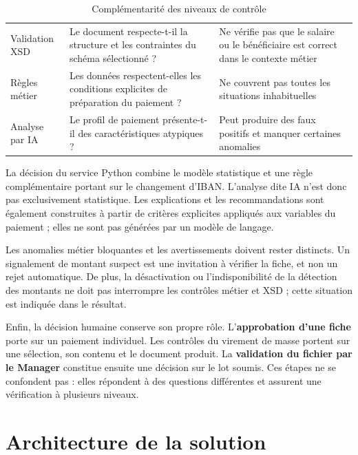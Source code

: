 \begin{table}[H]
\centering
\small
\renewcommand{\arraystretch}{1.25}
\tablestyle
\begin{tabularx}{\textwidth}{|>{\raggedright\arraybackslash}p{2.7cm}|Y|Y|}
\hline
{} &  &  \\
\hline
Validation XSD & Le document respecte-t-il la structure et les contraintes du schéma sélectionné ? & Ne vérifie pas que le salaire ou le bénéficiaire est correct dans le contexte métier \\
\hline
Règles métier & Les données respectent-elles les conditions explicites de préparation du paiement ? & Ne couvrent pas toutes les situations inhabituelles \\
\hline
Analyse par IA & Le profil de paiement présente-t-il des caractéristiques atypiques ? & Peut produire des faux positifs et manquer certaines anomalies \\
\hline
\end{tabularx}
\caption{Complémentarité des niveaux de contrôle}
\label{tab:controle-hybride}
\end{table}

La décision du service Python combine le modèle statistique et une règle complémentaire portant sur le changement d'IBAN. L'analyse dite \og IA\fg{} n'est donc pas exclusivement statistique. Les explications et les recommandations sont également construites à partir de critères explicites appliqués aux variables du paiement ; elles ne sont pas générées par un modèle de langage.

Les anomalies métier bloquantes et les avertissements doivent rester distincts. Un signalement de montant suspect est une invitation à vérifier la fiche, et non un rejet automatique. De plus, la désactivation ou l'indisponibilité de la détection des montants ne doit pas interrompre les contrôles métier et XSD ; cette situation est indiquée dans le résultat.

Enfin, la décision humaine conserve son propre rôle. L'\textbf{approbation d'une fiche} porte sur un paiement individuel. Les contrôles du virement de masse portent sur une sélection, son contenu et le document produit. La \textbf{validation du fichier par le Manager} constitue ensuite une décision sur le lot soumis. Ces étapes ne se confondent pas : elles répondent à des questions différentes et assurent une vérification à plusieurs niveaux.

\section{Architecture de la solution}

